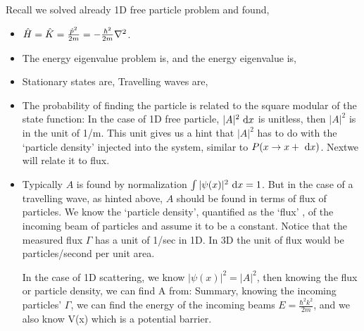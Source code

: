 \documentclass{school-22.101-notes}
\begin{document}
\clearpage
{}
Recall we solved already 1D free particle problem and found, 
\begin{itemize}
\item $\hat{H} = \hat{K} = \frac{\hat{p}^2}{2m} = - \frac{\hbar^2}{2m} \nabla^2$. 

\item The energy eigenvalue problem is, 
  and the energy eigenvalue is, 

\item Stationary states are, 
  Travelling waves are, 

\item The probability of finding the particle is related to the square modular of the state function:
In the case of 1D free particle, $|A|^2 \mbox{ }\mathrm{d} x$ is unitless, then $|A|^2$ is in the unit of 1/m. This unit gives us a hint that $|A|^2$ has to do with the `particle density' injected into the system, similar to $P(x\to x+\mbox{ }\mathrm{d} x)$. Nextwe will relate it to flux. 

\item Typically $A$ is found by normalization $\int |\psi(x)|^2 \mbox{ }\mathrm{d} x = 1$. But in the case of a travelling wave, as hinted above, $A$ should be found in terms of flux of particles. We know the `particle density', quantified as the `flux' , of the incoming beam of particles and assume it to be a constant. 
Notice that the measured flux $\Gamma$ has a unit of 1/sec in 1D. In 3D the unit of flux would be particles/second per unit area. 

In the case of 1D scattering, we know $|\psi(x)|^2 = |A|^2$, then knowing the flux or particle density, we can find A from:
Summary, knowing the incoming particles' $\Gamma$, we can find the energy of the incoming beams $E = \frac{\hbar^2 k^2}{2m}$, and we also know V(x) which is a potential barrier.


\end{itemize}
\end{document}
